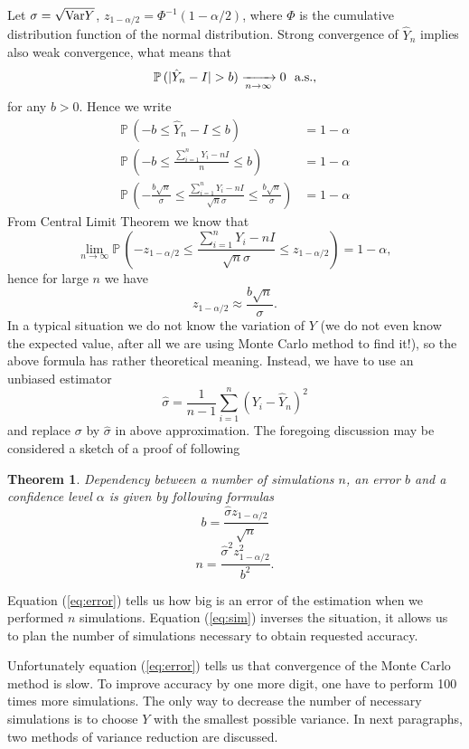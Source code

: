 \documentclass[a4paper,11pt, twoside]{book}
\newtheorem{thm}{Theorem}[chapter]
\theoremstyle{definition}
\theoremstyle{remark}
\def\Var{{\rm Var}}
\def\P{{\mathbb{P}}\,}
\def\conv{\xrightarrow[n \rightarrow \infty]{}}
\def\limn{\lim\limits_{n \rightarrow \infty} }
\begin{document}
Let $\sigma = \sqrt{\Var{Y}}$, $z_{1-\alpha/2} = \Phi^{-1}(1-\alpha/2)$, where $\Phi$ is the cumulative distribution function of the normal distribution.
Strong convergence of $\hat{Y}_n$ implies also weak convergence, what means that
\[ \P(|\hat{Y}_n - I| > b) \conv 0 \hbox{\ \ a.s.,} \]
for any $b > 0$. 
Hence we write
\begin{align*}
 \P(-b \leq \hat{Y}_n - I \leq b) &= 1 - \alpha\\
 \P(-b \leq \frac{\sum\limits_{i=1}^n Y_i - nI}{n}  \leq b) &= 1 - \alpha\\
 \P(-\frac{b\sqrt{n}}{\sigma} \leq \frac{\sum\limits_{i=1}^n Y_i - nI}{\sqrt{n}\sigma}  \leq \frac{b\sqrt{n}}{\sigma}) &= 1 - \alpha
\end{align*}
From Central Limit Theorem we know that
\[ \limn \P(-z_{1-\alpha/2} \leq \frac{\sum\limits_{i=1}^n Y_i - nI}{\sqrt{n}\sigma}  \leq z_{1-\alpha/2}) = 1 - \alpha, \]
hence for large $n$ we have
\[z_{1-\alpha/2} \approx \frac{b\sqrt{n}}{\sigma}.\]
In a typical situation we do not know the variation of $Y$ (we do not even know the expected value, after all we are using Monte Carlo method to find it!), so the above formula has rather theoretical meaning.
Instead, we have to use an unbiased estimator
\[ \hat{\sigma} = \frac{1}{n-1}\sum\limits_{i=1}^n (Y_i - \hat{Y}_n)^2 \]
and replace $\sigma$ by $\hat{\sigma}$ in above approximation. The foregoing discussion may be considered a sketch of a proof of following
\begin{thm}
 Dependency between a number of simulations $n$, an error $b$ and a confidence level $\alpha$ is given by following formulas
 \begin{equation}
   \label{eq:error}
   b = \frac{\hat{\sigma} z_{1-\alpha/2}}{\sqrt{n}}
 \end{equation}
 \begin{equation}
   \label{eq:sim}
   n = \frac{\hat{\sigma}^2 z_{1-\alpha/2}^2}{b^2}.
 \end{equation}
\end{thm}
\noindent Equation (\ref{eq:error}) tells us how big is an error of the estimation when we performed $n$ simulations. Equation (\ref{eq:sim}) inverses the situation, it allows us to plan the number of simulations necessary to obtain requested accuracy.

Unfortunately equation (\ref{eq:error}) tells us that convergence of the Monte Carlo method is slow. To improve accuracy by one more digit, one have to perform 100 times more simulations. The only way to decrease the number of necessary simulations is to choose $Y$ with the smallest possible variance. In next paragraphs, two methods of variance reduction are discussed.
\end{document}
